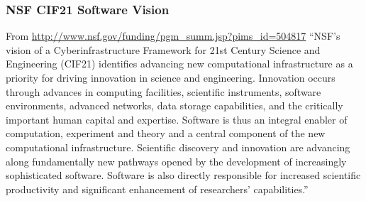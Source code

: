 \begin{frame}
\frametitle{NSF CIF21 Software Vision}

From \url{http://www.nsf.gov/funding/pgm_summ.jsp?pims_id=504817}
\vskip 0.15in
``NSF's vision of a Cyberinfrastructure Framework for 21st Century Science and Engineering (CIF21) identifies advancing new computational infrastructure as a priority for driving innovation in science and engineering. Innovation occurs through advances in computing facilities, scientific instruments, software environments, advanced networks, data storage capabilities, and the critically important human capital and expertise. Software is thus an integral enabler of computation, experiment and theory and a central component of the new computational infrastructure. Scientific discovery and innovation are advancing along fundamentally new pathways opened by the development of increasingly sophisticated software. Software is also directly responsible for increased scientific productivity and significant enhancement of researchers' capabilities.''

\end{frame}


